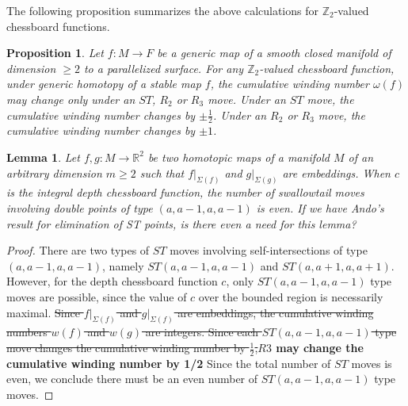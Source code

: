 \documentclass[12pt]{amsart}
\def \R{\mathbb{R}}
\def \Z{\mathbb{Z}}
\def\co{\colon}
\newtheorem{lemma}[theorem]{Lemma}
\newtheorem{proposition}[theorem]{Proposition}
\theoremstyle{definition}
\begin{document}
{The following proposition summarizes the above calculations for $\Z_2$-valued chessboard functions.
 

  
\begin{proposition} \label{l:21a} Let $f\co M\to F$ be a generic map of a smooth closed manifold of dimension $\ge 2$ to a parallelized surface. For any $\Z_2$-valued chessboard function,
under generic homotopy of a stable map $f$,  the cumulative winding number $\omega(f)$  may change only under an $ST$, $R_2$ or $R_3$ move.  Under an $ST$ move, the cumulative winding number changes by $\pm \frac{1}{2}$.  Under an $R_2$ or $R_3$ move,  the cumulative winding number changes by $\pm 1$.  
 \end{proposition}

\iffalse
\begin{lemma}\label{l:24}
Let $f,g:M\rightarrow \R^2$ be two homotopic maps of a manifold $M$ of an arbitrary dimension $m\ge 2$ such that $f|_{\Sigma(f)}$ and $g|_{\Sigma(g)}$ are embeddings. When $c$ is the integral depth chessboard function,  the number of swallowtail moves involving double points of type $(a,a-1,a,a-1)$ is even. {\color{red} If we have Ando's result for elimination of ST points, is there even a need for this lemma?}
\end{lemma}
\begin{proof}
There are two types of $ST$ moves involving self-intersections of type $(a,a-1,a,a-1)$, namely $ST(a,a-1,a,a-1)$ and $ST(a,a+1,a,a+1)$. 
However, for the depth chessboard function $c$, only $ST(a,a-1,a,a-1)$ type moves are possible, since the value of $c$ over the bounded region is necessarily maximal. 
{\color{red} \sout{Since $f|_{\Sigma(f)}$ and $g|_{\Sigma(f)}$ are embeddings, the cumulative winding numbers $w(f)$ and $w(g)$ are integers. 
  Since each $ST(a,a-1,a,a-1)$ type move changes the cumulative winding number by $\frac{1}{2}$,}{\bf $R3$ may change the cumulative winding number by 1/2}} Since the total number of $ST$ moves is even, we conclude there must be an even number of $ST(a,a-1,a,a-1)$ type moves.  
\end{proof}




}
\end{document}
